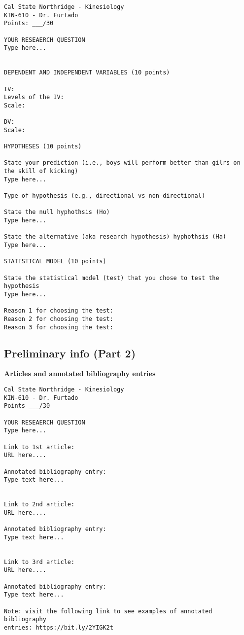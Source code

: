 \documentclass[
]{article}
\begin{document}
\begin{verbatim}
Cal State Northridge - Kinesiology
KIN-610 - Dr. Furtado
Points: ___/30

YOUR RESEAERCH QUESTION
Type here...


DEPENDENT AND INDEPENDENT VARIABLES (10 points)

IV: 
Levels of the IV:
Scale:

DV:
Scale:

HYPOTHESES (10 points)

State your prediction (i.e., boys will perform better than gilrs on the skill of kicking)
Type here...

Type of hypothesis (e.g., directional vs non-directional)

State the null hyphothsis (Ho)
Type here...

State the alternative (aka research hypothesis) hyphothsis (Ha)
Type here...

STATISTICAL MODEL (10 points)

State the statistical model (test) that you chose to test the hypothesis
Type here...

Reason 1 for choosing the test:
Reason 2 for choosing the test:
Reason 3 for choosing the test:
\end{verbatim}

\hypertarget{preliminary-info-part-2}{%
\subsection{Preliminary info (Part 2)}\label{preliminary-info-part-2}}

\textbf{Articles and annotated bibliography entries}

\begin{verbatim}
Cal State Northridge - Kinesiology
KIN-610 - Dr. Furtado
Points ___/30

YOUR RESEAERCH QUESTION
Type here...

Link to 1st article:
URL here....

Annotated bibliography entry:
Type text here...


Link to 2nd article:
URL here....

Annotated bibliography entry:
Type text here...


Link to 3rd article:
URL here....

Annotated bibliography entry:
Type text here...

Note: visit the following link to see examples of annotated bibliography
entries: https://bit.ly/2YIGK2t
\end{verbatim}
\end{document}
